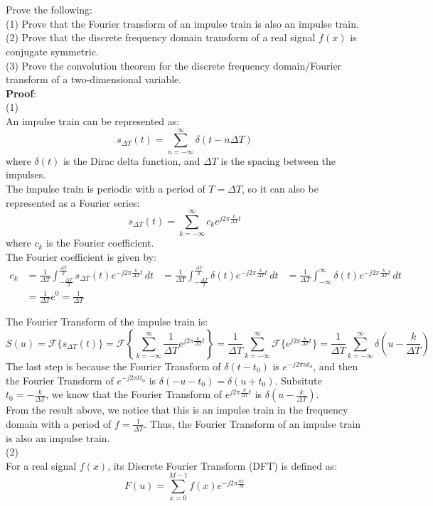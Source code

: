 \documentclass[UTF8]{ctexart}
\begin{document}
\section{}
Prove the following:\\
(1) Prove that the Fourier transform of an impulse train is also an impulse train.\\
(2) Prove that the discrete frequency domain transform of a real signal $f(x)$ is conjugate symmetric.\\
(3) Prove the convolution theorem for the discrete frequency domain/Fourier transform of a two-dimensional variable.\\
\textbf{Proof}:\\
(1)\\
An impulse train can be represented as:
\[
s_{\Delta T} (t) = \sum_{n=-\infty}^{\infty} \delta(t - n\Delta T)
\]
where \( \delta(t) \) is the Dirac delta function, and \( \Delta T \) is the spacing between the impulses.\\
The impulse train is periodic with a period of \( T = \Delta T \), so it can also be represented as a Fourier series:
\[
s_{\Delta T} (t) = \sum_{k=-\infty}^{\infty} c_k e^{j2\pi \frac{k}{\Delta T} t}
\]
where \( c_k \) is the Fourier coefficient.\\
The Fourier coefficient is given by:
\begin{equation*}
    \begin{aligned}
        c_k &= \frac{1}{\Delta T} \int_{-\frac{\Delta T}{2}}^{\frac{\Delta T}{2}} s_{\Delta T} (t) e^{-j2\pi \frac{k}{\Delta T} t} \, dt
        &= \frac{1}{\Delta T} \int_{-\frac{\Delta T}{2}}^{\frac{\Delta T}{2}} \delta(t) e^{-j2\pi \frac{k}{\Delta T} t} \, dt
        &= \frac{1}{\Delta T} \int_{-\infty}^{\infty} \delta(t) e^{-j2\pi \frac{k}{\Delta T} t} \, dt\\
        &= \frac{1}{\Delta T} e^0 = \frac{1}{\Delta T}
    \end{aligned}
\end{equation*}

The Fourier Transform of the impulse train is:
\[
S(u) = \mathcal{F}\{s_{\Delta T} (t)\} = \mathcal{F} \left\{ \sum_{k=-\infty}^{\infty} \frac{1}{\Delta T} e^{j2\pi \frac{k}{\Delta T} t} \right\} 
= \frac{1}{\Delta T} \sum_{k=-\infty}^{\infty} \mathcal{F}\{e^{j2\pi \frac{k}{\Delta T} t}\}
= \frac{1}{\Delta T} \sum_{k=-\infty}^{\infty} \delta \left( u - \frac{k}{\Delta T} \right)
\]
The last step is because the Fourier Transform of $\delta(t-t_0)$ is $e^{-j2\pi ut_0}$, and then the Fourier Transform of
$e^{-j2\pi tt_0}$ is $\delta(-u-t_0) = \delta(u+t_0)$. Subsitute $t_0 = -\frac{k}{\Delta T}$, we know that the Fourier Transform of
\( e^{j2\pi \frac{k}{\Delta T} t} \) is \( \delta \left( u - \frac{k}{\Delta T} \right) \).\\
From the result above, we notice that this is an impulse train in the frequency domain with a period of \( f = \frac{1}{\Delta T} \). 
Thus, the Fourier Transform of an impulse train is also an impulse train.\\
(2)\\
For a real signal \( f(x) \), its Discrete Fourier Transform (DFT) is defined as:
\[
F(u) = \sum_{x=0}^{M-1} f(x) e^{-j2\pi \frac{ux}{M}}
\]
\end{document}
